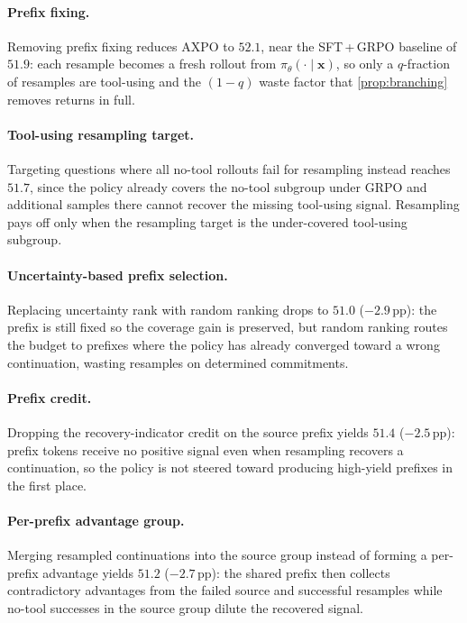 \documentclass{llmxive}
\providecommand{\bm}[1]{\boldsymbol{#1}}
\providecommand{\vx}{{\bm{x}}}
\begin{document}
\paragraph{Prefix fixing.}
Removing prefix fixing reduces AXPO to $52.1$, near the SFT\,+\,GRPO baseline of $51.9$: each resample becomes a fresh rollout from $\pi_\theta(\cdot \mid \vx)$, so only a $q$-fraction of resamples are tool-using and the $(1{-}q)$ waste factor that \autoref{prop:branching} removes returns in full.

\paragraph{Tool-using resampling target.}
Targeting questions where all no-tool rollouts fail for resampling instead reaches $51.7$, since the policy already covers the no-tool subgroup under GRPO and additional samples there cannot recover the missing tool-using signal. Resampling pays off only when the resampling target is the under-covered tool-using subgroup.

\paragraph{Uncertainty-based prefix selection.}
Replacing uncertainty rank with random ranking drops to $51.0$ ($-2.9$\,pp): the prefix is still fixed so the coverage gain is preserved, but random ranking routes the budget to prefixes where the policy has already converged toward a wrong continuation, wasting resamples on determined commitments.

\paragraph{Prefix credit.}
Dropping the recovery-indicator credit on the source prefix yields $51.4$ ($-2.5$\,pp): prefix tokens receive no positive signal even when resampling recovers a continuation, so the policy is not steered toward producing high-yield prefixes in the first place.

\paragraph{Per-prefix advantage group.}
Merging resampled continuations into the source group instead of forming a per-prefix advantage yields $51.2$ ($-2.7$\,pp): the shared prefix then collects contradictory advantages from the failed source and successful resamples while no-tool successes in the source group dilute the recovered signal.
\end{document}
